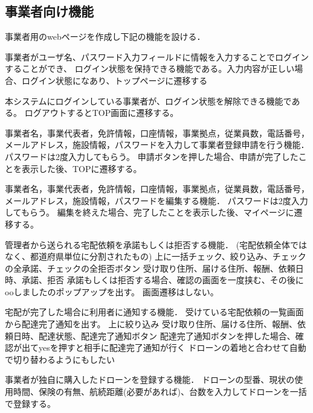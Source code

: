\documentclass[a4paper, titlepage]{jsarticle}
\begin{document}
\subsection{事業者向け機能}
事業者用のwebページを作成し下記の機能を設ける．
\begin{description}[labelwidth=\linewidth]
  \setlength{\leftskip}{1em}
  \item [ログイン機能] 事業者がユーザ名、パスワード入力フィールドに情報を入力することでログインすることができ、
  ログイン状態を保持できる機能である。入力内容が正しい場合、ログイン状態になあり、トップページに遷移する
  \item [ログアウト機能] 本システムにログインしている事業者が、ログイン状態を解除できる機能である。
  ログアウトするとTOP画面に遷移する。
  \item [事業者登録申請機能] 事業者名，事業代表者，免許情報，口座情報，事業拠点，従業員数，電話番号，メールアドレス，施設情報，パスワードを入力して事業者登録申請を行う機能．
  パスワードは2度入力してもらう。
  申請ボタンを押した場合、申請が完了したことを表示した後、TOPに遷移する。
  \item [事業者情報編集機能] 事業者名，事業代表者，免許情報，口座情報，事業拠点，従業員数，電話番号，メールアドレス，施設情報，パスワードを編集する機能．
  パスワードは2度入力してもらう。
  編集を終えた場合、完了したことを表示した後、マイページに遷移する。

  \item [依頼受注判断機能] 管理者から送られる宅配依頼を承諾もしくは拒否する機能．
  (宅配依頼全体ではなく、都道府県単位に分割されたもの)
  上に一括チェック、絞り込み、チェックの全承諾、チェックの全拒否ボタン
  受け取り住所、届ける住所、報酬、依頼日時、承諾、拒否
  承諾もしくは拒否する場合、確認の画面を一度挟む、その後にooしましたのポップアップを出す。
  画面遷移はしない。

  \item [配達完了通知機能] 宅配が完了した場合に利用者に通知する機能．
  受けている宅配依頼の一覧画面から配達完了通知を出す。
  上に絞り込み
  受け取り住所、届ける住所、報酬、依頼日時、配達状態、配達完了通知ボタン
  配達完了通知ボタンを押した場合、確認が出てyesを押すと相手に配達完了通知が行く
  ドローンの着地と合わせて自動で切り替わるようにもしたい

  \item [使用ドローン登録機能] 事業者が独自に購入したドローンを登録する機能．
  ドローンの型番、現状の使用時間、保険の有無、航続距離(必要があれば)、台数を入力してドローンを一括で登録する。


\end{description}
\end{document}
